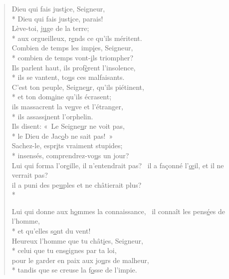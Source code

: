 \begin{verse}
Dieu qui fais just\underline{i}ce, Seigneur, \\*
Dieu qui fais just\underline{i}ce, parais! \\
Lève-toi, j\underline{u}ge de la terre; \\*
aux orgueilleux, r\underline{e}nds ce qu’ils méritent. \\

Combien de temps les imp\underline{i}es, Seigneur, \\*
combien de temps vont-\underline{i}ls triompher? \\
Ils parlent haut, ils prof\underline{è}rent l’insolence, \\*
ils se vantent, to\underline{u}s ces malfaisants. \\

C’est ton peuple, Seigne\underline{u}r, qu’ils piétinent, \\*
et ton dom\underline{a}ine qu’ils écrasent; \\
ils massacrent la ve\underline{u}ve et l’étranger, \\*
ils assass\underline{i}nent l’orphelin. \\

Ils disent: « Le Seigne\underline{u}r ne voit pas, \\*
le Dieu de Jac\underline{o}b ne sait pas! » \\
Sachez-le, espr\underline{i}ts vraiment stupides; \\*
insensés, comprendrez-vo\underline{u}s un jour? \\

Lui qui forma l’or\underline{e}ille, il n’entendrait pas?~\psalmdagger
il a façonné l’\underline{œ}il, et il ne verrait pas? \\
il a puni des pe\underline{u}ples et ne châtierait plus? \\*

Lui qui donne aux h\underline{o}mmes la connaissance,~\psalmdagger
{}il connaît les pens\underline{é}es de l’homme, \\*
et qu’elles s\underline{o}nt du vent! \\

Heureux l’homme que tu chât\underline{i}es, Seigneur, \\*
celui que tu ens\underline{e}ignes par ta loi, \\
pour le garder en paix aux jo\underline{u}rs de malheur, \\*
tandis que se creuse la f\underline{o}sse de l’impie. \\


\end{verse}
